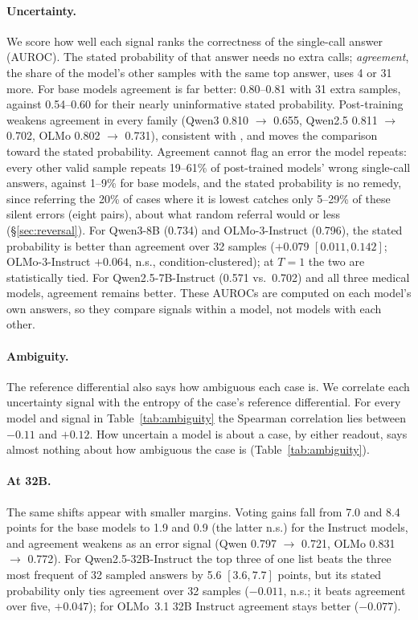 \documentclass[11pt]{article}
\begin{document}
\paragraph{Uncertainty.}
We score how well each signal ranks the correctness of the single-call answer (AUROC). The stated probability of that answer needs no extra calls; \emph{agreement}, the share of the model's other samples with the same top answer, uses 4 or 31 more.
For base models agreement is far better: 0.80--0.81 with 31 extra samples, against 0.54--0.60 for their nearly uninformative stated probability.
Post-training weakens agreement in every family (Qwen3 0.810 $\rightarrow$ 0.655, Qwen2.5 0.811 $\rightarrow$ 0.702, OLMo 0.802 $\rightarrow$ 0.731), consistent with \citet{liu2026alignmenttax}, and moves the comparison toward the stated probability. Agreement cannot flag an error the model repeats: every other valid sample repeats 19--61\% of post-trained models' wrong single-call answers, against 1--9\% for base models, and the stated probability is no remedy, since referring the 20\% of cases where it is lowest catches only 5--29\% of these silent errors (eight pairs), about what random referral would or less (\S\ref{sec:reversal}).
For Qwen3-8B (0.734) and OLMo-3-Instruct (0.796), the stated probability is better than agreement over 32 samples ($+0.079$ $[0.011,0.142]$; OLMo-3-Instruct $+0.064$, n.s., condition-clustered); at $T{=}1$ the two are statistically tied.
For Qwen2.5-7B-Instruct (0.571 vs.\ 0.702) and all three medical models, agreement remains better.
These AUROCs are computed on each model's own answers, so they compare signals within a model, not models with each other.

\paragraph{Ambiguity.}
The reference differential also says how ambiguous each case is. We correlate each uncertainty signal with the entropy of the case's reference differential.
For every model and signal in Table~\ref{tab:ambiguity} the Spearman correlation lies between $-0.11$ and $+0.12$.
How uncertain a model is about a case, by either readout, says almost nothing about how ambiguous the case is (Table~\ref{tab:ambiguity}).

\paragraph{At 32B.}
The same shifts appear with smaller margins. Voting gains fall from 7.0 and 8.4 points for the base models to 1.9 and 0.9 (the latter n.s.) for the Instruct models, and agreement weakens as an error signal (Qwen 0.797 $\rightarrow$ 0.721, OLMo 0.831 $\rightarrow$ 0.772). For Qwen2.5-32B-Instruct the top three of one list beats the three most frequent of 32 sampled answers by 5.6 $[3.6,7.7]$ points, but its stated probability only ties agreement over 32 samples ($-0.011$, n.s.; it beats agreement over five, $+0.047$); for OLMo~3.1 32B Instruct agreement stays better ($-0.077$).
\end{document}
